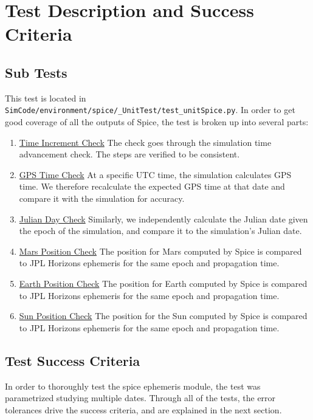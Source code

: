\section{Test Description and Success Criteria}

\subsection{Sub Tests}

This test is located in {\tt SimCode/environment/spice/\_UnitTest/test\_unitSpice.py}. In order to get good coverage of all the outputs of Spice, the test is broken up into several parts: \par

\begin{enumerate}
\item \underline{Time Increment Check} The check goes through the simulation time advancement check. The steps are verified to be consistent. 
\item \underline{GPS Time Check} At a specific UTC time, the simulation calculates GPS time. We therefore recalculate the expected GPS time at that date and compare it with the simulation for accuracy. 
\item \underline{Julian Day Check} Similarly, we independently calculate the Julian date given the epoch of the simulation, and compare it to the simulation's Julian date.
\item \underline{Mars Position Check} The position for Mars computed by Spice is compared to JPL Horizons ephemeris for the same epoch and propagation time.
\item \underline{Earth Position Check} The position for Earth computed by Spice is compared to JPL Horizons ephemeris for the same epoch and propagation time.
\item \underline{Sun Position Check} The position for the Sun computed by Spice is compared to JPL Horizons ephemeris for the same epoch and propagation time.
\end{enumerate} 

\subsection{Test Success Criteria}

In order to thoroughly test the spice ephemeris module, the test was parametrized studying multiple dates. Through all of the tests, the error tolerances drive the success criteria, and are explained in the next section. 

